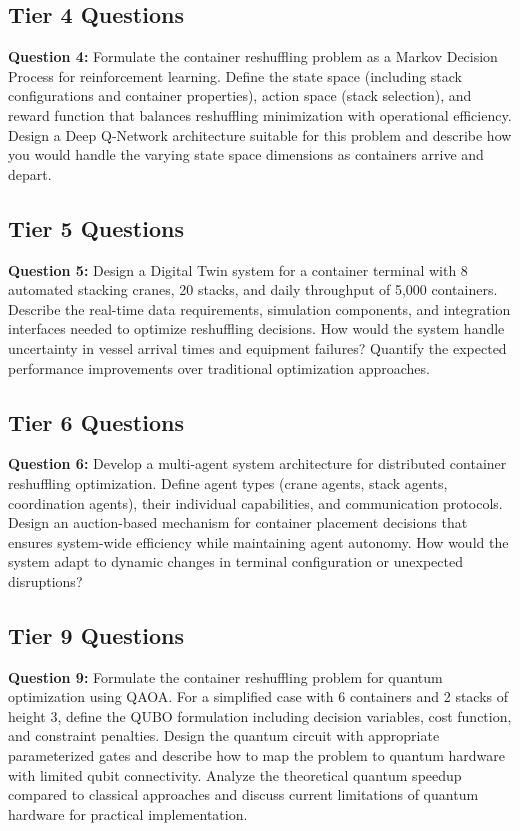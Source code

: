 \documentclass{article}
\begin{document}
\subsection{Tier 4 Questions}

\textbf{Question 4:} Formulate the container reshuffling problem as a Markov Decision Process for reinforcement learning. Define the state space (including stack configurations and container properties), action space (stack selection), and reward function that balances reshuffling minimization with operational efficiency. Design a Deep Q-Network architecture suitable for this problem and describe how you would handle the varying state space dimensions as containers arrive and depart.

\subsection{Tier 5 Questions}

\textbf{Question 5:} Design a Digital Twin system for a container terminal with 8 automated stacking cranes, 20 stacks, and daily throughput of 5,000 containers. Describe the real-time data requirements, simulation components, and integration interfaces needed to optimize reshuffling decisions. How would the system handle uncertainty in vessel arrival times and equipment failures? Quantify the expected performance improvements over traditional optimization approaches.

\subsection{Tier 6 Questions}

\textbf{Question 6:} Develop a multi-agent system architecture for distributed container reshuffling optimization. Define agent types (crane agents, stack agents, coordination agents), their individual capabilities, and communication protocols. Design an auction-based mechanism for container placement decisions that ensures system-wide efficiency while maintaining agent autonomy. How would the system adapt to dynamic changes in terminal configuration or unexpected disruptions?

\subsection{Tier 9 Questions}

\textbf{Question 9:} Formulate the container reshuffling problem for quantum optimization using QAOA. For a simplified case with 6 containers and 2 stacks of height 3, define the QUBO formulation including decision variables, cost function, and constraint penalties. Design the quantum circuit with appropriate parameterized gates and describe how to map the problem to quantum hardware with limited qubit connectivity. Analyze the theoretical quantum speedup compared to classical approaches and discuss current limitations of quantum hardware for practical implementation.
\end{document}
